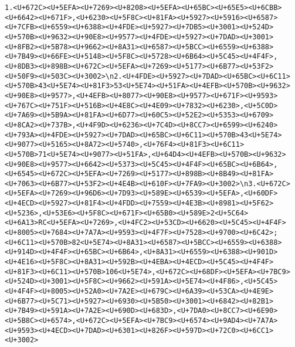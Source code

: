\documentclass[
]{article}
\begin{document}
\begin{verbatim}
1.<U+672C><U+5EFA><U+7269><U+8208><U+5EFA><U+65BC><U+65E5><U+6CBB><U+6642><U+671F>,<U+6230><U+5F8C><U+81FA><U+5927><U+5916><U+6587><U+7CFB><U+6559><U+6388><U+4FDE><U+5927><U+7DB5><U+3001><U+524D><U+570B><U+9632><U+90E8><U+9577><U+4FDE><U+5927><U+7DAD><U+3001><U+8FB2><U+5B78><U+9662><U+8A31><U+6587><U+5BCC><U+6559><U+6388><U+7B49><U+66FE><U+5148><U+5F8C><U+5728><U+6B64><U+5C45><U+4F4F>,<U+8DB3><U+898B><U+672C><U+5EFA><U+7269><U+5177><U+6B77><U+53F2><U+50F9><U+503C><U+3002>\n2.<U+4FDE><U+5927><U+7DAD><U+65BC><U+6C11><U+570B>43<U+5E74><U+81F3>53<U+5E74><U+51FA><U+4EFB><U+570B><U+9632><U+90E8><U+9577>,<U+4EFB><U+8077><U+90E8><U+9577><U+671F><U+9593><U+767C><U+751F><U+516B><U+4E8C><U+4E09><U+7832><U+6230>,<U+5C0D><U+7A69><U+5B9A><U+81FA><U+6D77><U+60C5><U+52E2><U+5353><U+6709><U+8CA2><U+737B>,<U+4F9D><U+6236><U+7C4D><U+8CC7><U+6599><U+6240><U+793A><U+4FDE><U+5927><U+7DAD><U+65BC><U+6C11><U+570B>43<U+5E74><U+9077><U+5165><U+8A72><U+5740>,<U+76F4><U+81F3><U+6C11><U+570B>71<U+5E74><U+9077><U+51FA>,<U+64D4><U+4EFB><U+570B><U+9632><U+90E8><U+9577><U+6642><U+5373><U+5C45><U+4F4F><U+65BC><U+6B64>,<U+6545><U+672C><U+5EFA><U+7269><U+5177><U+898B><U+8B49><U+81FA><U+7063><U+6B77><U+53F2><U+4E4B><U+610F><U+7FA9><U+3002>\n3.<U+672C><U+5EFA><U+7269><U+96D6><U+7D93><U+589E><U+6539><U+5EFA>,<U+60DF><U+4ECD><U+5927><U+81F4><U+4FDD><U+7559><U+4E3B><U+8981><U+5F62><U+5236>,<U+53E6><U+5F8C><U+671F><U+65B0><U+589E>2<U+5C64><U+6A13>RC<U+5EFA><U+7269>,<U+4FC2><U+53CD><U+6620><U+5C45><U+4F4F><U+8005><U+7684><U+7A7A><U+9593><U+4F7F><U+7528><U+9700><U+6C42>;<U+6C11><U+570B>82<U+5E74><U+8A31><U+6587><U+5BCC><U+6559><U+6388><U+914D><U+4F4F><U+65BC><U+6B64>,<U+8A31><U+6559><U+6388><U+901D><U+4E16><U+5F8C><U+8A31><U+592B><U+4EBA><U+4ECD><U+5C45><U+4F4F><U+81F3><U+6C11><U+570B>106<U+5E74>,<U+672C><U+68DF><U+5EFA><U+7BC9><U+524D><U+3001><U+5F8C><U+9662><U+591A><U+5E74><U+4F86>,<U+5C45><U+4F4F><U+8005><U+52A0><U+7A2E><U+679C><U+6A39><U+53CA><U+4E9E><U+6B77><U+5C71><U+5927><U+6930><U+5B50><U+3001><U+6842><U+82B1><U+7B49><U+591A><U+7A2E><U+690D><U+683D>,<U+7DA0><U+8CC7><U+6E90><U+5B8C><U+6574>,<U+672C><U+5EFA><U+7BC9><U+6574><U+9AD4><U+7A7A><U+9593><U+4ECD><U+7DAD><U+6301><U+826F><U+597D><U+72C0><U+6CC1><U+3002>

\end{verbatim}
\end{document}
